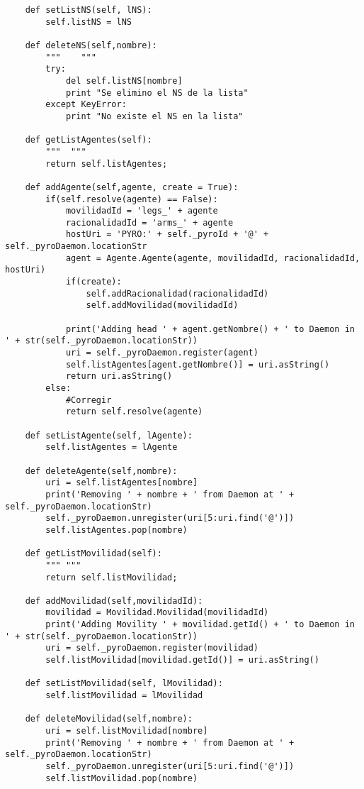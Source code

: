 \documentclass{article}
\begin{document}
\begin{lstlisting}
    def setListNS(self, lNS):
        self.listNS = lNS
        
    def deleteNS(self,nombre):
        """    """
        try:
            del self.listNS[nombre]
            print "Se elimino el NS de la lista"
        except KeyError:
            print "No existe el NS en la lista"
        
    def getListAgentes(self):  
        """  """
        return self.listAgentes;
    
    def addAgente(self,agente, create = True):
        if(self.resolve(agente) == False):
            movilidadId = 'legs_' + agente
            racionalidadId = 'arms_' + agente
            hostUri = 'PYRO:' + self._pyroId + '@' + self._pyroDaemon.locationStr
            agent = Agente.Agente(agente, movilidadId, racionalidadId, hostUri)
            if(create):
                self.addRacionalidad(racionalidadId)
                self.addMovilidad(movilidadId)

            print('Adding head ' + agent.getNombre() + ' to Daemon in ' + str(self._pyroDaemon.locationStr))
            uri = self._pyroDaemon.register(agent)
            self.listAgentes[agent.getNombre()] = uri.asString()
            return uri.asString()
        else:
            #Corregir
            return self.resolve(agente)

    def setListAgente(self, lAgente):
        self.listAgentes = lAgente
        
    def deleteAgente(self,nombre):
        uri = self.listAgentes[nombre]
        print('Removing ' + nombre + ' from Daemon at ' + self._pyroDaemon.locationStr)
        self._pyroDaemon.unregister(uri[5:uri.find('@')])
        self.listAgentes.pop(nombre)
            
    def getListMovilidad(self):
        """ """
        return self.listMovilidad;
        
    def addMovilidad(self,movilidadId): 
        movilidad = Movilidad.Movilidad(movilidadId)
        print('Adding Movility ' + movilidad.getId() + ' to Daemon in ' + str(self._pyroDaemon.locationStr))
        uri = self._pyroDaemon.register(movilidad)
        self.listMovilidad[movilidad.getId()] = uri.asString()

    def setListMovilidad(self, lMovilidad):
        self.listMovilidad = lMovilidad
        
    def deleteMovilidad(self,nombre):
        uri = self.listMovilidad[nombre]
        print('Removing ' + nombre + ' from Daemon at ' + self._pyroDaemon.locationStr)
        self._pyroDaemon.unregister(uri[5:uri.find('@')])
        self.listMovilidad.pop(nombre)
            

\end{lstlisting}
\end{document}
